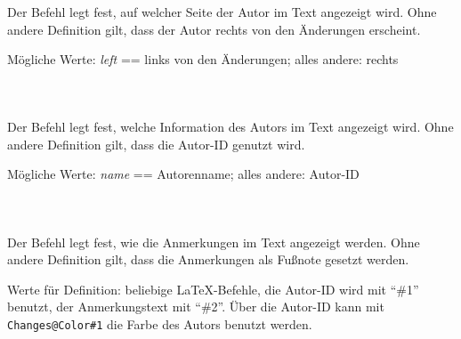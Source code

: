 \subsubsection{}
\DescribeMacro{\setauthormarkupposition}

Der Befehl  legt fest, auf welcher Seite der Autor im Text angezeigt wird.
Ohne andere Definition gilt, dass der Autor rechts von den Änderungen erscheint.

Mögliche Werte: \emph{left} == links von den Änderungen; alles andere: rechts\\
\begin{chusage}
		\>\\
	\usageexample
		\>
\end{chusage}

\subsubsection{}
\DescribeMacro{\setauthormarkuptext}

Der Befehl  legt fest, welche Information des Autors im Text angezeigt wird.
Ohne andere Definition gilt, dass die Autor-ID genutzt wird.

Mögliche Werte: \emph{name} == Autorenname; alles andere: Autor-ID\\
\begin{chusage}
		\>\\
	\usageexample
		\>
\end{chusage}

\subsubsection{}
\DescribeMacro{\setremarkmarkup}

Der Befehl  legt fest, wie die Anmerkungen im Text angezeigt werden.
Ohne andere Definition gilt, dass die Anmerkungen als Fußnote gesetzt werden.

Werte für Definition: beliebige \LaTeX-Befehle, die Autor-ID wird mit "`\#1"' benutzt, der Anmerkungstext mit "`\#2"'.
Über die Autor-ID kann mit \texttt{Changes@Color\#1} die Farbe des Autors benutzt werden.
\begin{chusage}
		\>\\
	\usageexample
		\>\\
		\>
\end{chusage}

